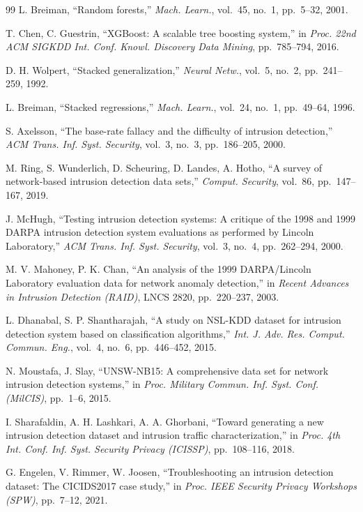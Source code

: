 \documentclass[journal]{IEEEtran}
\begin{document}
\begin{thebibliography}{99}
L. Breiman, ``Random forests,'' \textit{Mach. Learn.}, vol.~45, no.~1, pp.~5--32, 2001.

T. Chen, C. Guestrin, ``{XGBoost}: A scalable tree boosting system,'' in \textit{Proc. 22nd ACM SIGKDD Int. Conf. Knowl. Discovery Data Mining}, pp.~785--794, 2016.

D. H. Wolpert, ``Stacked generalization,'' \textit{Neural Netw.}, vol.~5, no.~2, pp.~241--259, 1992.

L. Breiman, ``Stacked regressions,'' \textit{Mach. Learn.}, vol.~24, no.~1, pp.~49--64, 1996.

S. Axelsson, ``The base-rate fallacy and the difficulty of intrusion detection,'' \textit{ACM Trans. Inf. Syst. Security}, vol.~3, no.~3, pp.~186--205, 2000.

M. Ring, S. Wunderlich, D. Scheuring, D. Landes, A. Hotho, ``A survey of network-based intrusion detection data sets,'' \textit{Comput. Security}, vol.~86, pp.~147--167, 2019.

J. McHugh, ``Testing intrusion detection systems: A critique of the 1998 and 1999 {DARPA} intrusion detection system evaluations as performed by {Lincoln Laboratory},'' \textit{ACM Trans. Inf. Syst. Security}, vol.~3, no.~4, pp.~262--294, 2000.

M. V. Mahoney, P. K. Chan, ``An analysis of the 1999 {DARPA/Lincoln Laboratory} evaluation data for network anomaly detection,'' in \textit{Recent Advances in Intrusion Detection (RAID)}, LNCS 2820, pp.~220--237, 2003.

L. Dhanabal, S. P. Shantharajah, ``A study on {NSL-KDD} dataset for intrusion detection system based on classification algorithms,'' \textit{Int. J. Adv. Res. Comput. Commun. Eng.}, vol.~4, no.~6, pp.~446--452, 2015.

N. Moustafa, J. Slay, ``{UNSW-NB15}: A comprehensive data set for network intrusion detection systems,'' in \textit{Proc. Military Commun. Inf. Syst. Conf. (MilCIS)}, pp.~1--6, 2015.

I. Sharafaldin, A. H. Lashkari, A. A. Ghorbani, ``Toward generating a new intrusion detection dataset and intrusion traffic characterization,'' in \textit{Proc. 4th Int. Conf. Inf. Syst. Security Privacy (ICISSP)}, pp.~108--116, 2018.

G. Engelen, V. Rimmer, W. Joosen, ``Troubleshooting an intrusion detection dataset: The {CICIDS2017} case study,'' in \textit{Proc. IEEE Security Privacy Workshops (SPW)}, pp.~7--12, 2021.


\end{thebibliography}
\end{document}
